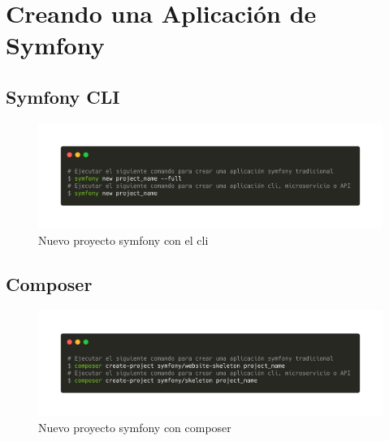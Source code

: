 \section{Creando una Aplicación de Symfony}
\subsection{Symfony CLI}
\begin{figure}[ht]
    \centering
    \includegraphics[width=\textwidth]{../assets/symfony_new.png}
    \caption{Nuevo proyecto symfony con el cli}
    \label{fig:symfony_new}
\end{figure}
\clearpage
\subsection{Composer}

\begin{figure}[ht]
    \centering
    \includegraphics[width=\textwidth]{../assets/composer_create.png}
    \caption{Nuevo proyecto symfony con composer}
    \label{fig:composer_create}
\end{figure}
